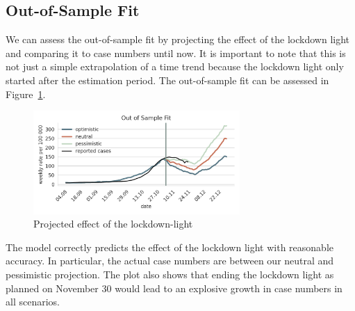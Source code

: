 \subsection{Out-of-Sample Fit}

We can assess the out-of-sample fit by projecting the effect of the lockdown light and comparing it to case numbers until now. It is important to note that this is not just a simple extrapolation of a time trend because the lockdown light only started after the estimation period. The out-of-sample fit can be assessed in Figure~\ref{fig:out-of-sample-fit}.

\begin{figure}[!ht]
    \centering
    \includegraphics[width=0.7\textwidth]{../figures/out_of_sample_validation}
    \caption{Projected effect of the lockdown-light}
    \label{fig:out-of-sample-fit}
\end{figure}

The model correctly predicts the effect of the lockdown light with reasonable accuracy. In particular, the actual case numbers are between our neutral and pessimistic projection. The plot also shows that ending the lockdown light as planned on November 30 would lead to an explosive growth in case numbers in all scenarios.
